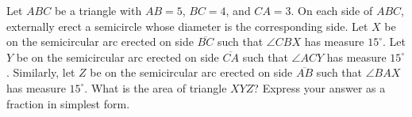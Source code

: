 Let $ABC$ be a triangle with $AB=5$, $BC=4$, and $CA=3$. On each side of $ABC$, externally erect a semicircle whose diameter is the corresponding side. Let $X$ be on the semicircular arc erected on side $\overline{BC}$ such that $\angle{CBX}$ has measure $15^\circ$. Let $Y$ be on the semicircular arc erected on side $\overline{CA}$ such that $\angle{ACY}$ has measure $15^\circ$. Similarly, let $Z$ be on the semicircular arc erected on side $\overline{AB}$ such that $\angle{BAX}$ has measure $15^\circ$. What is the area of triangle $XYZ$? Express your answer as a fraction in simplest form.